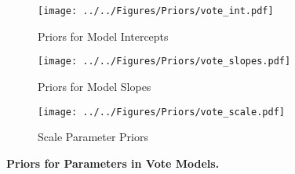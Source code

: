 \documentclass[12pt]{article}
\begin{document}
\begin{appendices}
\begin{figure*}[!htb]
    \centering
    \begin{subfigure}[b]{0.45\textwidth}
        \centering
        \texttt{[image: ../../Figures/Priors/vote\_int.pdf]}
        \caption{Priors for Model Intercepts}
    \end{subfigure}
    \begin{subfigure}[b]{0.45\textwidth}
        \centering
        \texttt{[image: ../../Figures/Priors/vote\_slopes.pdf]}
        \caption{Priors for Model Slopes}
    \end{subfigure}
    \begin{subfigure}[b]{0.45\textwidth}
    	\centering
        \texttt{[image: ../../Figures/Priors/vote\_scale.pdf]}
        \caption{Scale Parameter Priors}
    \end{subfigure}
    \caption{\textbf{Priors for Parameters in Vote Models.}}
    \label{fig: priors}
\end{figure*}


\end{appendices}
\end{document}
